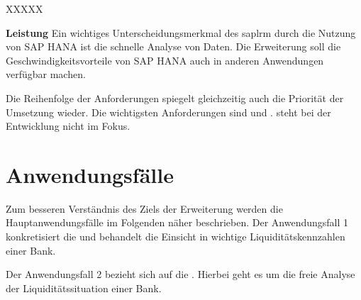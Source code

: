 \begin{onehalfspacing}
\begin{seToplist}{ XXXXX }
\item[\anfl{leistung}] \textbf{Leistung} \newline
Ein wichtiges Unterscheidungsmerkmal des \gls{saplrm} durch die Nutzung von SAP HANA ist die schnelle Analyse von Daten. Die Erweiterung soll die Geschwindigkeitsvorteile von SAP HANA auch in anderen Anwendungen verfügbar machen.

\end{seToplist}

Die Reihenfolge der Anforderungen spiegelt gleichzeitig auch die Priorität der Umsetzung wieder. Die wichtigsten Anforderungen sind  und .  steht bei der Entwicklung nicht im Fokus.

\section{Anwendungsfälle}
Zum besseren Verständnis des Ziels der Erweiterung werden die Hauptanwendungsfälle im Folgenden näher beschrieben. Der Anwendungsfall 1 konkretisiert die  und behandelt die Einsicht in wichtige Liquiditätskennzahlen einer Bank.


Der Anwendungsfall 2 bezieht sich auf die . Hierbei geht es um die freie Analyse der Liquiditätssituation einer Bank.


\end{onehalfspacing}
